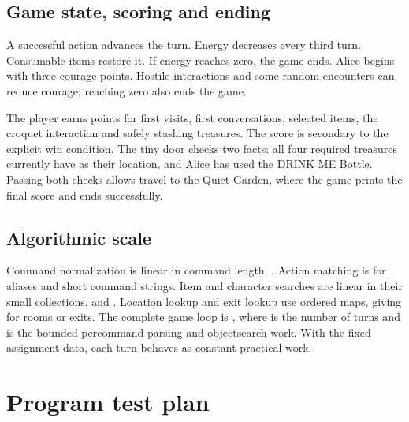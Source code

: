 \documentclass[letterpaper,10pt,english]{sphinxmanual}
\begin{document}
\subsection{Game state, scoring and ending}
\label{\detokenize{AssignmentFour/main:game-state-scoring-and-ending}}
\sphinxAtStartPar
A successful action advances the turn. Energy decreases every third turn.
Consumable items restore it. If energy reaches zero, the game ends. Alice begins
with three courage points. Hostile interactions and some random encounters can
reduce courage; reaching zero also ends the game.

\sphinxAtStartPar
The player earns points for first visits, first conversations, selected items,
the croquet interaction and safely stashing treasures. The score is secondary
to the explicit win condition. The tiny door checks two facts: all four
required treasures currently have  as their location, and Alice has
used the DRINK ME Bottle. Passing both checks allows travel to the Quiet Garden,
where the game prints the final score and ends successfully.


\subsection{Algorithmic scale}
\label{\detokenize{AssignmentFour/main:algorithmic-scale}}
\sphinxAtStartPar
Command normalization is linear in command length, . Action matching is
 for  aliases and short command strings. Item and character
searches are linear in their small collections,  and . Location
lookup and exit lookup use ordered maps, giving  for  rooms or
exits. The complete game loop is , where  is the number of
turns and  is the bounded per\sphinxhyphen{}command parsing and object\sphinxhyphen{}search work. With
the fixed assignment data, each turn behaves as constant practical work.


\section{Program test plan}
\label{\detokenize{AssignmentFour/main:program-test-plan}}
\begin{sphinxVerbatim}[commandchars=\\\{\}]
   
\end{sphinxVerbatim}
\end{document}
